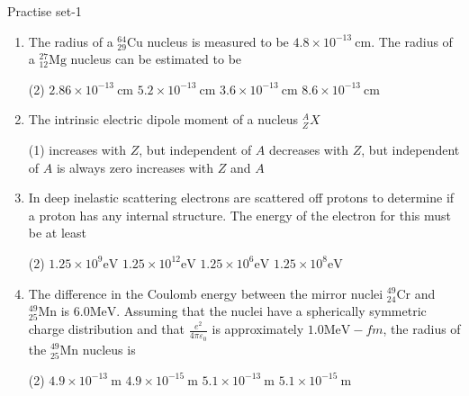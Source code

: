 \newpage
\begin{abox}
	Practise set-1
\end{abox}
\begin{enumerate}
	\item  The radius of a ${ }_{29}^{64} \mathrm{Cu}$ nucleus is measured to be $4.8 \times 10^{-13} \mathrm{~cm}$. The radius of a ${ }_{12}^{27} \mathrm{Mg}$ nucleus can be estimated to be
	 \begin{tasks}(2)
		\task[\textbf{a.}]$2.86 \times 10^{-13} \mathrm{~cm}$
		\task[\textbf{b.}]$5.2 \times 10^{-13} \mathrm{~cm}$
		\task[\textbf{c.}] $3.6 \times 10^{-13} \mathrm{~cm}$
		\task[\textbf{d.}] $8.6 \times 10^{-13} \mathrm{~cm}$
	\end{tasks}
\item  The intrinsic electric dipole moment of a nucleus ${ }_Z^A X$
	 \begin{tasks}(1)
		\task[\textbf{a.}]increases with $Z$, but independent of $A$
		\task[\textbf{b.}]decreases with $Z$, but independent of $A$
		\task[\textbf{c.}] is always zero
		\task[\textbf{d.}] increases with $Z$ and $A$
	\end{tasks}
\item  In deep inelastic scattering electrons are scattered off protons to determine if a proton has any internal structure. The energy of the electron for this must be at least
	 \begin{tasks}(2)
		\task[\textbf{a.}]$1.25 \times 10^9 \mathrm{eV}$
		\task[\textbf{b.}]$1.25 \times 10^{12} \mathrm{eV}$
		\task[\textbf{c.}] $1.25 \times 10^6 \mathrm{eV}$
		\task[\textbf{d.}] $1.25 \times 10^8 \mathrm{eV}$
	\end{tasks}
\item  The difference in the Coulomb energy between the mirror nuclei ${ }_{24}^{49} \mathrm{Cr}$ and ${ }_{25}^{49} \mathrm{Mn}$ is $6.0 \mathrm{MeV}$. Assuming that the nuclei have a spherically symmetric charge distribution and that $\frac{e^2}{4 \pi \varepsilon_0}$ is approximately $1.0 \mathrm{MeV}-f m$, the radius of the ${ }_{25}^{49} \mathrm{Mn}$ nucleus is
	 \begin{tasks}(2)
		\task[\textbf{a.}]$4.9 \times 10^{-13} \mathrm{~m}$
		\task[\textbf{b.}]$4.9 \times 10^{-15} \mathrm{~m}$
		\task[\textbf{c.}]$5.1 \times 10^{-13} \mathrm{~m}$
		\task[\textbf{d.}] $5.1 \times 10^{-15} \mathrm{~m}$
	\end{tasks}
\end{enumerate}
\setlength\arrayrulewidth{1pt}
